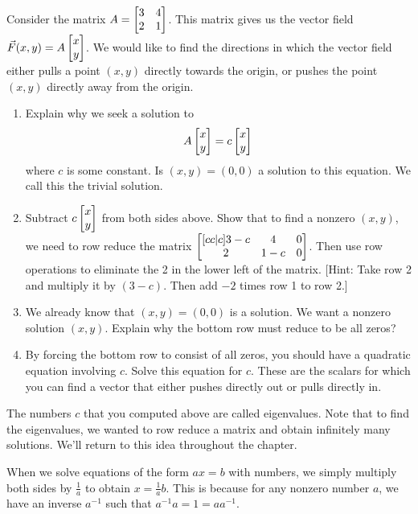 \begin{problem}
Consider the matrix 
$A=\begin{bmatrix} 3&4\\2&1 \end{bmatrix}$.  
This matrix gives us the vector field 
$\vec F(x,y) = A\begin{bmatrix} x\\y \end{bmatrix}$. 
We would like to find the directions in which the vector field either pulls a point $(x,y)$ directly towards the origin, 
or pushes the point $(x,y)$ directly away from the origin.
\begin{enumerate}
 \item Explain why we seek a solution to $$ A\begin{bmatrix} x\\y \end{bmatrix} = c\begin{bmatrix} x\\y \end{bmatrix}$$ where $c$ is some constant. Is $(x,y)=(0,0)$ a solution to this equation.  We call this the trivial solution.
 \item Subtract $c\begin{bmatrix} x\\y \end{bmatrix}$ from both sides above.  Show that to find a nonzero $(x,y)$, we need to row reduce the matrix $\begin{bmatrix} [cc|c]3-c&4&0\\2&1-c&0 \end{bmatrix}$. Then use row operations to eliminate the 2 in the lower left of the matrix. [Hint: Take row 2 and multiply it by $(3-c)$.  Then add $-2$ times row 1 to row 2.]
 \item We already know that $(x,y)=(0,0)$ is a solution.  We want a nonzero solution $(x,y)$. Explain why the bottom row must reduce to be all zeros?
 \item By forcing the bottom row to consist of all zeros, you should have a quadratic equation involving $c$. Solve this equation for $c$.  
 These are the scalars for which you can find a vector that either pushes directly out or pulls directly in. 
\end{enumerate}
\end{problem}

The numbers $c$ that you computed above are called eigenvalues. Note that to find the eigenvalues, we wanted to row reduce a matrix and obtain infinitely many solutions. We'll return to this idea throughout the chapter.  

\mysubsection{\ideamul}

When we solve equations of the form $ax=b$ with numbers, we simply multiply both sides by $\frac{1}{a}$ to obtain $x=\frac{1}{a}b$. This is because for any nonzero number $a$, we have an inverse $a^{-1}$ such that $a^{-1}a = 1=aa^{-1}$. 
 
